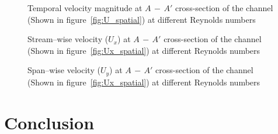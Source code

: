 \documentclass[preprint, letterpaper, nobibnotes, aps, superscriptaddress,prb]{revtex4-1}
\begin{document}
\begin{figure}[H]
  \centering {}
  \caption{Temporal velocity magnitude at $A\,-\,A'$ cross-section of the channel (Shown in figure~\ref{fig:U_spatial}) at different Reynolds numbers}\protect\label{fig:Re_U}
\end{figure}

\begin{figure}[H]
  \centering {}
  \caption{Stream--wise velocity ($U_x$) at $A\,-\,A'$ cross-section of the channel (Shown in figure~\ref{fig:Ux_spatial}) at different Reynolds numbers}\protect\label{fig:Re_Ux}
\end{figure}

\begin{figure}[H]
  \centering {}
  \caption{Span--wise velocity ($U_y$) at $A\,-\,A'$ cross-section of the channel (Shown in figure~\ref{fig:Ux_spatial}) at different Reynolds numbers}\protect\label{fig:Re_Uy}
\end{figure}





\section{Conclusion}
\end{document}
